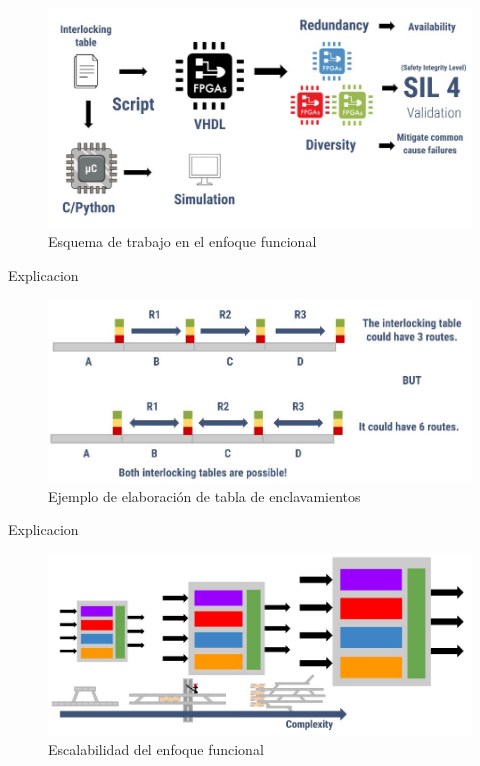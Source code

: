 		\begin{figure}[h]
		\centering
			\includegraphics[scale=.4]{./Figures/Funcional_workflow}
			\caption{Esquema de trabajo en el enfoque funcional}
			\label{fig:Funcional}
		\end{figure}
	
	Explicacion
			
		\begin{figure}[h]
		\centering
			\includegraphics[scale=.4]{./Figures/Tablas}
			\caption{Ejemplo de elaboración de tabla de enclavamientos}
			\label{fig:EJ_Tabla}
		\end{figure}
	
	Explicacion		
			
		\begin{figure}[h]
		\centering
			\includegraphics[scale=.4]{./Figures/Funcional_complejidad}
			\caption{Escalabilidad del enfoque funcional}
			\label{fig:Funcional}
		\end{figure}
		
